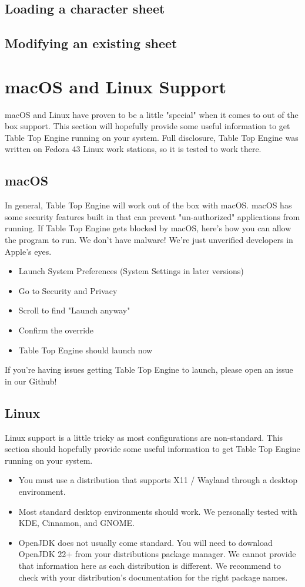 \documentclass{article}
\begin{document}
\subsection{Loading a character sheet}
\subsection{Modifying an existing sheet}

\newpage
\section{macOS and Linux Support}
macOS and Linux have proven to be a little "special" when it comes to out of the box support. This section will hopefully provide some useful information to get Table Top Engine running on your system. Full disclosure, Table Top Engine was written on Fedora 43 Linux work stations, so it is tested to work there. 
\subsection{macOS}
In general, Table Top Engine will work out of the box with macOS. macOS has some security features built in that can prevent "un-authorized" applications from running. If Table Top Engine gets blocked by macOS, here's how you can allow the program to run. We don't have malware! We're just unverified developers in Apple's eyes. 
\begin{itemize}
    \item Launch System Preferences (System Settings in later versions) 
    \item Go to Security and Privacy
    \item Scroll to find "Launch anyway" 
    \item Confirm the override
    \item Table Top Engine should launch now
\end{itemize}
If you're having issues getting Table Top Engine to launch, please open an issue in our Github! 
\subsection{Linux}
Linux support is a little tricky as most configurations are non-standard. This section should hopefully provide some useful information to get Table Top Engine running on your system. 
\begin{itemize}
    \item You must use a distribution that supports X11 / Wayland through a desktop environment.
    \item Most standard desktop environments should work. We personally tested with KDE, Cinnamon, and GNOME.
    \item OpenJDK does not usually come standard. You will need to download OpenJDK 22+ from your distributions package manager. We cannot provide that information here as each distribution is different. We recommend to check with your distribution's documentation for the right package names. 
\end{itemize}
\newpage
\end{document}
